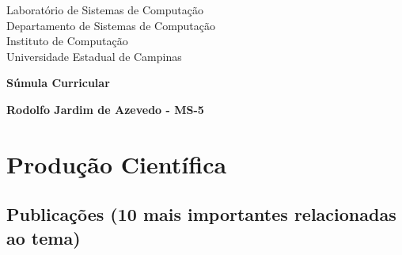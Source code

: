 \documentclass[11pt]{article}
\begin{document}
\thispagestyle{empty}

\begin{minipage}[tl]{31mm}
\end{minipage}
\hspace*{3mm}
\begin{minipage}[tl]{12cm}
  \begin{center}
    {
      {\Large Laboratório de Sistemas de Computação \\
        Departamento de Sistemas de Computação \\ 
        Instituto de Computação \\
        Universidade Estadual de Campinas}
    }
  \end{center}
\end{minipage}

{\LARGE
  \begin{center}
      \textbf{Súmula Curricular}

      \textbf{Rodolfo Jardim de Azevedo - MS-5}

  \end{center}
}

\section{Produção Científica}

\subsection{Publicações (10 mais importantes relacionadas ao tema)}
\end{document}
